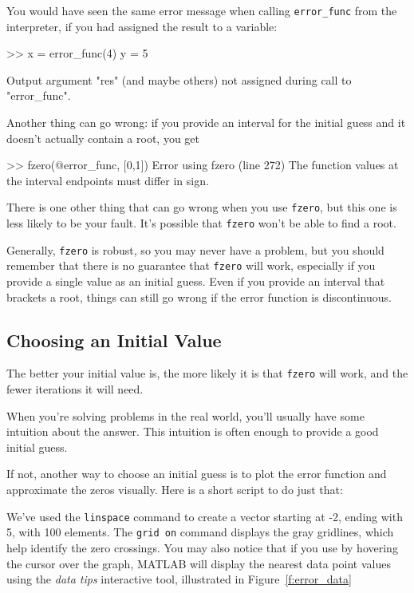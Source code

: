 
You would have seen the same error message when calling \lstinline{error_func} from the interpreter, if you had assigned the result to a variable:

\begin{code}
>> x = error_func(4)
y = 5

Output argument "res" (and maybe others) not assigned during
call to "error_func".
\end{code}

Another thing can go wrong: if you provide an interval for the
initial guess and it doesn't actually contain a root, you get

\begin{code}
>> fzero(@error_func, [0,1])
Error using fzero (line 272)
The function values at the interval endpoints must differ in sign.
\end{code}


There is one other thing that can go wrong when you use \lstinline{fzero}, but
this one is less likely to be your fault.  It's possible that \lstinline{fzero}
won't be able to find a root.

Generally, \lstinline{fzero} is robust, so you may never have a problem, but you should remember that there is no guarantee that \lstinline{fzero} will work, especially  if you provide a single value as an initial guess.  Even if you provide an interval that brackets a root, things can still go wrong if the error function is discontinuous.


\subsection{Choosing an Initial Value}

The better your initial value is, the more likely it is that
\lstinline{fzero} will work, and the fewer iterations it will
need.

When you're solving problems in the real world, you'll usually
have some intuition about the answer.  This intuition is often enough
to provide  a good initial guess.

If not, another way to choose an initial guess is to plot the error function and
approximate the zeros visually.  Here is a short script to do just that:



We've used the \lstinline{linspace} command to create a vector starting at -2, ending with 5, with 100 elements. The \lstinline{grid on} command displays the gray gridlines, which help identify the zero crossings.  You may also notice that if you use by hovering the cursor over the graph, MATLAB will display the nearest data point values using the \emph{data tips} interactive tool, illustrated in Figure~\ref{f:error_data}

